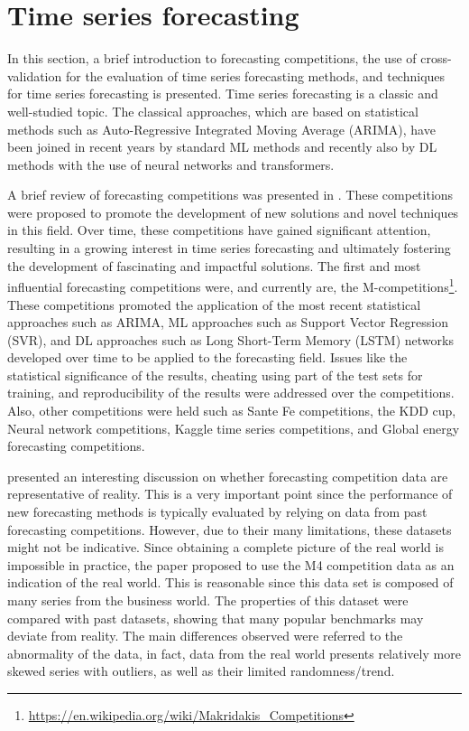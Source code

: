 \section{Time series forecasting}
\label{sec:timeseries}
\vspace{0.2 cm}

In this section, a brief introduction to forecasting competitions, the use of cross-validation for the evaluation of time series forecasting methods, and techniques for time series forecasting is presented.
Time series forecasting is a classic and well-studied topic.
The classical approaches, which are based on statistical methods such as Auto-Regressive Integrated Moving Average (ARIMA), have been joined in recent years by standard ML methods and recently also by DL methods with the use of neural networks and transformers.

A brief review of forecasting competitions was presented in \cite{HYNDMAN20207}.
These competitions were proposed to promote the development of new solutions and novel techniques in this field.
Over time, these competitions have gained significant attention, resulting in a growing interest in time series forecasting and ultimately fostering the development of fascinating and impactful solutions.
The first and most influential forecasting competitions were, and currently are, the M-competitions\footnote{ \url{https://en.wikipedia.org/wiki/Makridakis_Competitions} }.
These competitions promoted the application of the most recent statistical approaches such as ARIMA, ML approaches such as Support Vector Regression (SVR), and DL approaches such as Long Short-Term Memory (LSTM) networks developed over time to be applied to the forecasting field.
Issues like the statistical significance of the results, cheating using part of the test sets for training, and reproducibility of the results were addressed over the competitions.
Also, other competitions were held such as Sante Fe competitions, the KDD cup, Neural network competitions, Kaggle time series competitions, and Global energy forecasting competitions.

\cite{SPILIOTIS202037} presented an interesting discussion on whether forecasting competition data are representative of reality.
This is a very important point since the performance of new forecasting methods is typically evaluated by relying on data from past forecasting competitions.
However, due to their many limitations, these datasets might not be indicative.
Since obtaining a complete picture of the real world is impossible in practice, the paper proposed to use the M4 competition data as an indication of the real world.
This is reasonable since this data set is composed of many series from the business world.
The properties of this dataset were compared with past datasets, showing that many popular benchmarks may deviate from reality.
The main differences observed were referred to the abnormality of the data, in fact, data from the real world presents relatively more skewed series with outliers, as well as their limited randomness\slash trend.


